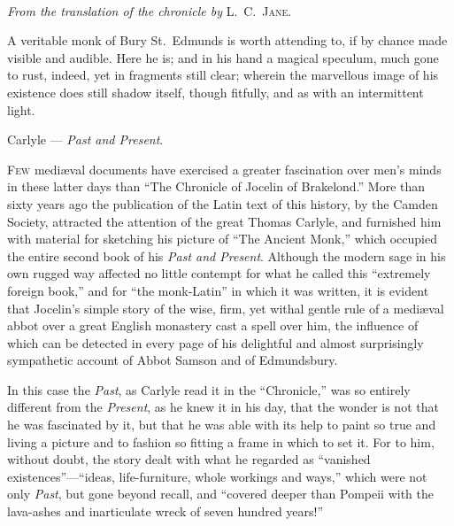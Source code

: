 \documentclass[10pt]{book}
\begin{document}
{\begin{center}
{\fontsize{13}{13} \selectfont
{}\\}
\vspace{.2cm}
\emph{From the translation of the chronicle by} \textsc{L.\ C.\ Jane.}
\end{center}


\begin{center}
\hspace{0cm}\vspace{-0.7cm}

\parbox{8.75cm}{
{\fontsize{9.5}{9.5} \selectfont
A veritable monk of Bury St.\ Edmunds is worth attending to, if by chance made visible and audible. Here he is; and in his hand a magical speculum, much gone to rust, indeed, yet in fragments still clear; wherein the marvellous image of his existence does still shadow itself, though fitfully, and as with an intermittent light.\linebreak{}
}

\hspace{0pt}\hfill Carlyle --- \emph{Past and Present}.
}

\end{center}

\vspace{.3cm}

{

{\setlength{\parskip}{0.0\baselineskip}\setlength{\parindent}{10pt}

\lettrine[lines=4]{\color{BrickRed}F}{ew} medi\ae{}val documents have exercised a greater fascination over men's minds in these latter days than ``The Chronicle of Jocelin of Brakelond.'' More than sixty years ago the publication of the Latin text of this history, by the Camden Society, attracted the attention of the great Thomas Carlyle, and furnished him with material for sketching his picture of ``The Ancient Monk,'' which occupied the entire second book of his \emph{Past and Present}. Although the modern sage in his own rugged way affected no little contempt for what he called this ``extremely foreign book,'' and for ``the monk-Latin'' in which it was written, it is evident that Jocelin's simple story of the wise, firm, yet withal gentle rule of a medi\ae{}val abbot over a great English monastery cast a spell over him, the influence of which can be detected in every page of his delightful and almost surprisingly sympathetic account of Abbot Samson and of Edmundsbury.

In this case the \emph{Past}, as Carlyle read it in the ``Chronicle,'' was so entirely different from the \emph{Present}, as he knew it in his day, that the wonder is not that he was fascinated by it, but that he was able with its help to paint so true and living a picture and to fashion so fitting a frame in which to set it. For to him, without doubt, the story dealt with what he regarded as ``vanished existences''---``ideas, life-furniture, whole workings and ways,'' which were not only \emph{Past}, but gone beyond recall, and ``covered deeper than Pompeii with the lava-ashes and inarticulate wreck of seven hundred years!''

}}}
\end{document}
